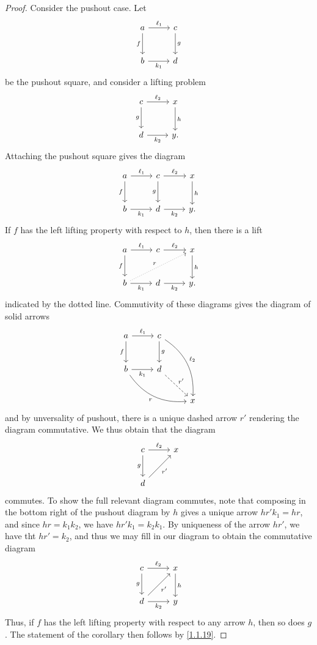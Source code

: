 \begin{proof}
	Consider the pushout case. Let
	\[\begin{tikzcd}[row sep = 2.5em, column sep = 2.5em]
	a \ar[" \ell _1 ", r] \ar[" f "', d]  & c \ar[" g ", d]  \\
	b \ar[" k_1 "', r]  & d
	\end{tikzcd}\]
	be the pushout square, and consider a lifting problem
	\[\begin{tikzcd}[row sep = 2.5em, column sep = 2.5em]
	c \ar[" \ell _2 ", r] \ar[" g "', d]  & x \ar[" h ", d]  \\
	d \ar[" k_2 "', r]  & y.
	\end{tikzcd}\]
	Attaching the pushout square gives the diagram
	\[\begin{tikzcd}[row sep = 2.5em, column sep = 2.5em]
	a \ar[" \ell _1 ", r] \ar[" f "', d]  & c \ar[" \ell_2 ", r] \ar[" g "', d]  & x\ar[" h ", d]  \\
	b \ar[" k_1 "', r]  & d\ar[" k_2 "', r]  & y.
	\end{tikzcd}\]
	If $f$ has the left lifting property with respect to $h$, then there is a lift
	\[\begin{tikzcd}[row sep = 2.5em, column sep = 2.5em]
	a \ar[" \ell _1 ", r] \ar[" f "', d]  & c \ar[" \ell_2 ", r]  & x\ar[" h ", d]  \\
	b \ar[" k_1 "', r] \ar[" r ", dotted, urr]  & d\ar[" k_2 "', r]  & y.
	\end{tikzcd}\]
	indicated by the dotted line. Commutivity of these diagrams gives the diagram of solid arrows
	\[\begin{tikzcd}[row sep = 2.5em, column sep = 2.5em]
	a \ar[" \ell _1 ", r] \ar[" f "', d]  & c \ar[" g ", d] \ar[" \ell _2 ", bend left, ddr]  &  \\
	b \ar[" k_1 "', r] \ar[" r "', bend right, drr]  & d \ar[" r' ", dashed, dr]  &  \\
	 &  & x
	\end{tikzcd}\]
	and by unversality of pushout, there is a unique dashed arrow $r'$ rendering the diagram commutative. We thus obtain that the diagram
	\[\begin{tikzcd}[row sep = 2.5em, column sep = 2.5em]
	c \ar[" \ell _2 ", r] \ar[" g "', d]  & x  \\
	d \ar[" r' "', ur]  & 
	\end{tikzcd}\]
	commutes. To show the full relevant diagram commutes, note that composing in the bottom right of the pushout diagram by $h$ gives a unique arrow $hr'k_1 = hr$, and since $hr=k_1k_2$, we have $hr'k_1=k_2k_1$. By uniqueness of the arrow $hr'$, we have tht $hr'=k_2$, and thus we may fill in our diagram to obtain the commutative diagram
	\[\begin{tikzcd}[row sep = 2.5em, column sep = 2.5em]
	c \ar[" \ell _2 ", r] \ar[" g "', d]  & x\ar[" h ", d]   \\
	d \ar[" r' "', ur] \ar[" k_2 "', r]  & y
	\end{tikzcd}\]
	Thus, if $f$ has the left lifting property with respect to any arrow $h$, then so does $g$. The statement of the corollary then follows by \cref{1.1.19}.
\end{proof}


